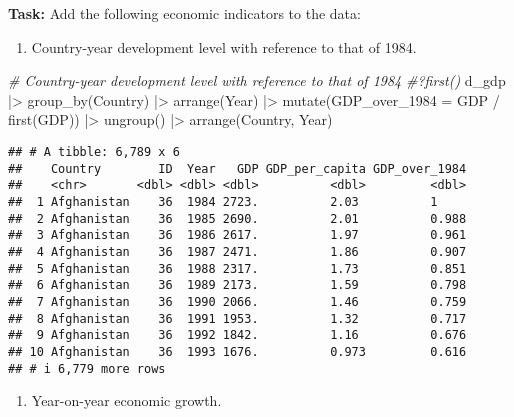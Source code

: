 \documentclass[
]{article}
\newenvironment{Shaded}{\begin{snugshade}}{\end{snugshade}}
\newcommand{\AttributeTok}[1]{\textcolor[rgb]{0.77,0.63,0.00}{#1}}
\newcommand{\CommentTok}[1]{\textcolor[rgb]{0.56,0.35,0.01}{\textit{#1}}}
\newcommand{\FunctionTok}[1]{\textcolor[rgb]{0.00,0.00,0.00}{#1}}
\newcommand{\NormalTok}[1]{#1}
\newcommand{\SpecialCharTok}[1]{\textcolor[rgb]{0.00,0.00,0.00}{#1}}
\providecommand{\tightlist}{%
  \setlength{\itemsep}{0pt}\setlength{\parskip}{0pt}}
\begin{document}
\textbf{Task:} Add the following economic indicators to the data:

\begin{enumerate}
\def\labelenumi{\arabic{enumi}.}
\tightlist
\item
  Country-year development level with reference to that of 1984.
\end{enumerate}

\begin{Shaded}
\begin{Highlighting}[]
\CommentTok{\# Country{-}year development level with reference to that of 1984}
\CommentTok{\#?first()}
\NormalTok{d\_gdp }\SpecialCharTok{|\textgreater{}}
  \FunctionTok{group\_by}\NormalTok{(Country) }\SpecialCharTok{|\textgreater{}}
  \FunctionTok{arrange}\NormalTok{(Year) }\SpecialCharTok{|\textgreater{}}
  \FunctionTok{mutate}\NormalTok{(}\AttributeTok{GDP\_over\_1984 =}\NormalTok{ GDP }\SpecialCharTok{/} \FunctionTok{first}\NormalTok{(GDP)) }\SpecialCharTok{|\textgreater{}}
  \FunctionTok{ungroup}\NormalTok{() }\SpecialCharTok{|\textgreater{}}
  \FunctionTok{arrange}\NormalTok{(Country, Year)}
\end{Highlighting}
\end{Shaded}

\begin{verbatim}
## # A tibble: 6,789 x 6
##    Country        ID  Year   GDP GDP_per_capita GDP_over_1984
##    <chr>       <dbl> <dbl> <dbl>          <dbl>         <dbl>
##  1 Afghanistan    36  1984 2723.          2.03          1    
##  2 Afghanistan    36  1985 2690.          2.01          0.988
##  3 Afghanistan    36  1986 2617.          1.97          0.961
##  4 Afghanistan    36  1987 2471.          1.86          0.907
##  5 Afghanistan    36  1988 2317.          1.73          0.851
##  6 Afghanistan    36  1989 2173.          1.59          0.798
##  7 Afghanistan    36  1990 2066.          1.46          0.759
##  8 Afghanistan    36  1991 1953.          1.32          0.717
##  9 Afghanistan    36  1992 1842.          1.16          0.676
## 10 Afghanistan    36  1993 1676.          0.973         0.616
## # i 6,779 more rows
\end{verbatim}

\begin{enumerate}
\def\labelenumi{\arabic{enumi}.}
\setcounter{enumi}{1}
\tightlist
\item
  Year-on-year economic growth.
\end{enumerate}
\end{document}

